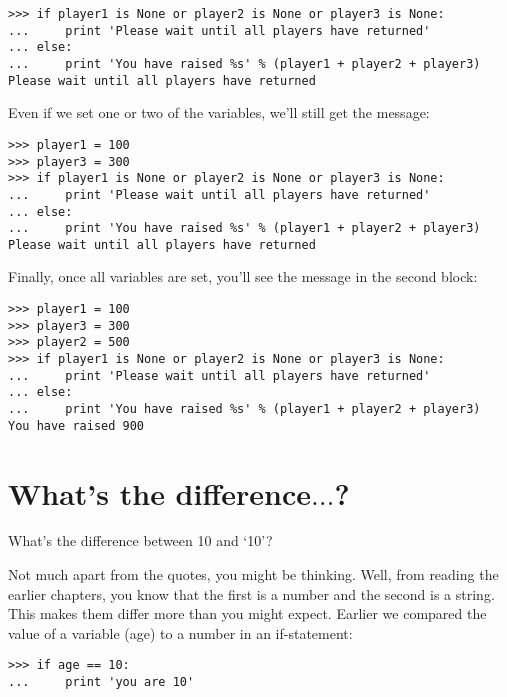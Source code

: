 \begin{listing}
\begin{verbatim}
>>> if player1 is None or player2 is None or player3 is None:
...     print 'Please wait until all players have returned'
... else:
...     print 'You have raised %s' % (player1 + player2 + player3)
Please wait until all players have returned
\end{verbatim}
\end{listing}

Even if we set one or two of the variables, we'll still get the message:

\begin{listing}
\begin{verbatim}
>>> player1 = 100
>>> player3 = 300
>>> if player1 is None or player2 is None or player3 is None:
...     print 'Please wait until all players have returned'
... else:
...     print 'You have raised %s' % (player1 + player2 + player3)
Please wait until all players have returned
\end{verbatim}
\end{listing}

\noindent
Finally, once all variables are set, you'll see the message in the second block:

\begin{listing}
\begin{verbatim}
>>> player1 = 100
>>> player3 = 300
>>> player2 = 500
>>> if player1 is None or player2 is None or player3 is None:
...     print 'Please wait until all players have returned'
... else:
...     print 'You have raised %s' % (player1 + player2 + player3)
You have raised 900
\end{verbatim}
\end{listing}

\section{What's the difference$\ldots$?}\label{whatsthedifference}

What's the difference between 10 and `10'?
\par
Not much apart from the quotes, you might be thinking.  Well, from reading the earlier chapters, you know that the first is a number and the second is a string. This makes them differ more than you might expect.  Earlier we compared the value of a variable (age) to a number in an if-statement:

\begin{listing}
\begin{verbatim}
>>> if age == 10:
...     print 'you are 10'
\end{verbatim}
\end{listing}

